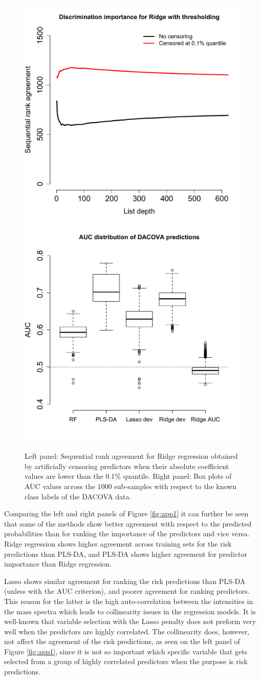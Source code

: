 \documentclass[12pt,a4paper]{article}
\theoremstyle{plain}
\begin{document}
\begin{figure}[htbp]
\begin{center}
\includegraphics[width=.49\textwidth]{pics/ridgeCensoring}%
\includegraphics[width=.49\textwidth]{pics/aucPlot}
\end{center}
\caption{Left panel: Sequential rank agreement for Ridge regression
  obtained by artificially censoring predictors when their absolute
  coefficient values are lower than the 0.1\% quantile. Right panel:
  Box plots of AUC values across the $1000$ sub-samples with respect
  to the known class labels of the DACOVA data.}
 \label{fig:app2}
\end{figure}

Comparing the left and right panels of Figure \ref{fig:app1} it can
further be seen that some of the methods show better agreement with
respect to the predicted probabilities than for ranking the importance
of the predictors and vice versa. Ridge regression shows higher agreement across training
sets for the risk predictions than PLS-DA, and PLS-DA shows higher
agreement for predictor importance than Ridge regression.

Lasso shows similar agreement for ranking the risk predictions than
PLS-DA (unless with the AUC criterion), and poorer agreement for ranking
predictors. This reason for the latter is the high auto-correlation
between the intensities in the mass spectra which leads to
collinearity issues in the regression models. It is well-known that
variable selection with the Lasso penalty does not preform very well
when the predictors are highly correlated. The collinearity does,
however, not affect the agreement of the risk predictions, as seen on
the left panel of Figure \ref{fig:app1}, since it is not so important
which specific variable that gets selected from a group of highly correlated
predictors when the purpose is risk predictions.
\end{document}
